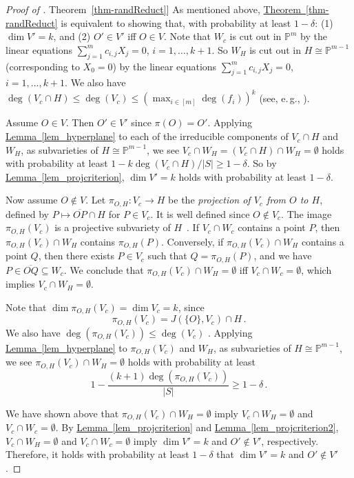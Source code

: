 \documentclass[11pt]{article}
\numberwithin{equation}{section}
\theoremstyle{definition}
\theoremstyle{plain}
\newcommand{\eg}{e.\,g.}
\newcommand{\expref}[2]{\hyperref[#2]{#1~\ref{#2}}}
\newcommand{\proj}{\mathbb{P}}
\begin{document}
\begin{proof}[Proof of \expref{Theorem}{thm-randReduct}]
As mentioned above, \expref{Theorem}{thm-randReduct} is equivalent to showing that, with probability at least $1-\delta$:  (1) $\dim V'=k$, and (2) $O'\in V'$ iff  $O\in V$.
Note that $W_c$ is cut out in $\proj^m$ by the linear equations $\sum_{j=1}^{m} c_{i,j} X_j=0$, $i=1,\dots,k+1$.
So $W_H$ is cut out in $H\cong \proj^{m-1}$ (corresponding to $X_0=0$) by the linear equations $\sum_{j=1}^m c_{i,j} X_j=0$, $i=1,\dots,k+1$. 
We also have $\deg(V_c\cap H)\leq \deg(V_c)\leq (\max_{i\in [m]}\deg(f_i))^k$ (see, \eg, \cite[Theorem~8.48]{burgisser2013algebraic}).

Assume $O\in V$. Then $O'\in V'$ since $\pi(O)=O'$. 
Applying \expref{Lemma}{lem_hyperplane} to  each of the irreducible components of $V_c\cap H$ and $W_H$, as subvarieties of $H\cong\proj^{m-1}$, we see $V_c\cap W_H=(V_c\cap H)\cap W_H=\emptyset$ holds with probability at least $1-k\deg(V_c \cap H)/|S|\geq 1-\delta$.
So by \expref{Lemma}{lem_projcriterion}, $\dim V'=k$ holds with probability at least $1-\delta$.

Now assume $O\not\in V$. 
Let $\pi_{O, H}: V_c\to H$ be the \emph{projection of $V_c$ from $O$ to $H$}, defined by $P\mapsto \overline{OP}\cap H$ for $P\in V_c$. It is well defined since $O\not\in V_c$. 
The image $\pi_{O,H}(V_c)$ is a projective subvariety of $H$~\cite[Theorem~3.5]{Har92}. 
If $V_c\cap W_c$ contains a point $P$, then $\pi_{O,H}(V_c)\cap W_H$ contains $\pi_{O,H}(P)$.
Conversely, if $\pi_{O,H}(V_c)\cap W_H$ contains a point $Q$, then there exists $P\in V_c$ such that $Q=\pi_{O,H}(P)$, and we have $P\in\overline{O Q}\subseteq W_c$.
We conclude that $\pi_{O,H}(V_c)\cap W_H=\emptyset$ iff  $V_c\cap W_c=\emptyset$, which implies  $V_c\cap W_H=\emptyset$. 

Note that $\dim \pi_{O,H}(V_c)=\dim V_c=k$, since
\[
  \pi_{O,H}(V_c)=J(\{O\}, V_c)\cap H\,.
\]
We also have $\deg(\pi_{O,H}(V_c))\leq \deg(V_c)$
\cite[Example~18.16]{Har92}.  Applying \expref{Lemma}{lem_hyperplane}
to $\pi_{O,H}(V_c)$ and $W_H$, as subvarieties of $H\cong\proj^{m-1}$,
we see $\pi_{O,H}(V_c)\cap W_H=\emptyset$ holds with probability at
least
\[
  1-\frac{(k+1)\deg(\pi_{O,H}(V_c))}{|S|} \geq 1-\delta\,.
\]

We have shown above that  $\pi_{O,H}(V_c)\cap W_H=\emptyset$ imply $V_c\cap W_H=\emptyset$ and $V_c\cap W_c=\emptyset$.
By  \expref{Lemma}{lem_projcriterion} and \expref{Lemma}{lem_projcriterion2},  $V_c\cap W_H=\emptyset$ and $V_c\cap W_c=\emptyset$ imply  $\dim V'=k$ and $O'\not\in V'$, respectively.
%
Therefore,  it holds with probability at least $1-\delta$ that $\dim V'=k$ and $O'\not\in V'$.
\end{proof}
\end{document}
